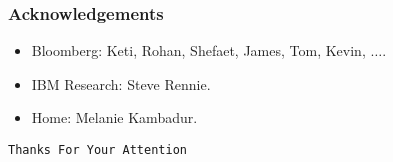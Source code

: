 
\begin{frame}
\frametitle{Acknowledgements}
\begin{itemize}
\item Bloomberg: Keti, Rohan, Shefaet, James, Tom, Kevin, $\dots{}$.
\item IBM Research: Steve Rennie.
\item Home: Melanie Kambadur.
\end{itemize}
%
\begin{center}
\colorbox{green!10}{
{\texttt{\color{m1}Thanks For Your Attention}}
}
\end{center}
%
\end{frame}


